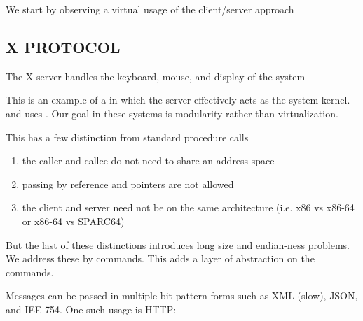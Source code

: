 \documentclass[../../lecture_notes.tex]{subfiles}
\begin{document}
We start by observing a virtual usage of the client/server approach

\subsection*{X PROTOCOL}

\begin{center}
\end{center}


The X server handles the keyboard, mouse, and display of the system

This is an example of a  in which the server effectively acts as the system kernel. and uses . Our goal in these systems is modularity rather than virtualization. 

This has a few distinction from standard procedure calls
\begin{enumerate}[nosep]
\item the caller and callee do not need to share an address space
\item passing by reference and pointers are not allowed
\item the client and server need not be on the same architecture (i.e. x86 vs x86-64 or x86-64 vs SPARC64)
\end{enumerate}


But the last of these distinctions introduces long size and endian-ness problems. We address these by  commands. This adds a layer of abstraction on the commands. 

Messages can be passed in multiple bit pattern forms such as XML (slow), JSON, and IEE 754. One such usage is HTTP:
\begin{center}
\end{center}
\end{document}
